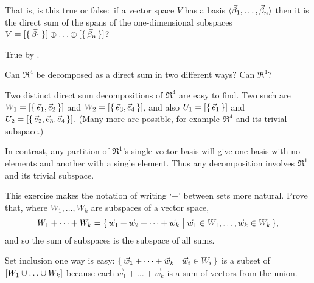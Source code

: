 \begin{exercises}
    That is, is this true or false:~if a vector space \( V \) has a basis
    \( \langle\vec{\beta}_1,\dots ,\vec{\beta}_n\rangle \) then
    it is the direct sum of the spans of the one-dimensional subspaces
    \( V=\spanof{\set{\vec{\beta}_1}}\directsum\dots
           \directsum\spanof{\set{\vec{\beta}_n}} \)?
    \begin{answer}
      True by .  
    \end{answer}
  \item 
    Can \( \Re^4 \) be decomposed as a direct sum in two different ways?
    Can \( \Re^1 \)?
    \begin{answer}
      Two distinct direct sum decompositions of \( \Re^4 \) are easy
      to find.
      Two such are
      \( W_1=\relax [\mbox{$\{\,\vec{e}_1,\vec{e}_2\,\}$}\relax ] \) and
      \( W_2=\relax [\mbox{$\{\,\vec{e}_3,\vec{e}_4\,\}$}\relax ] \), and also
      \( U_1=\relax [\mbox{$\{\,\vec{e}_1\,\}$}\relax ] \) and
      \( U_2=\relax [\mbox{$\{\,\vec{e}_2,\vec{e}_3,\vec{e}_4\,\}$}\relax ] \).
      (Many more are possible, 
      for example \( \Re^4 \) and its trivial subspace.)

      In contrast, any partition of \( \Re^1 \)'s single-vector basis will
      give one basis with no elements and another with a single element.
      Thus any decomposition involves \( \Re^1 \) and its trivial
      subspace. 
    \end{answer}
  \item 
     This exercise makes the notation of writing `$+$' between sets more
     natural. 
     Prove that, where \( W_1,\dots, W_k \) are subspaces of a vector space,
     \begin{equation*}
       W_1+\dots+W_k
       =\mbox{$\{\,\vec{w}_1+\vec{w}_2+\dots+\vec{w}_k
             \bigm| \vec{w}_1\in W_1,\dots,\vec{w}_k\in W_k\,\}$},
     \end{equation*}
     and so the sum of subspaces is the subspace of all sums.
     \begin{answer}
       Set inclusion one way is easy:
       \( \mbox{$\{\,\vec{w}_1+\dots+\vec{w}_k\bigm| \vec{w}_i\in W_i\,\}$} \)
       is a subset of \( \spanof{W_1\union \dots \union W_k}  \)
       because each \( \vec{w}_1+\dots+\vec{w}_k \) is a sum of vectors from 
       the union.


\end{answer}
\end{exercises}
